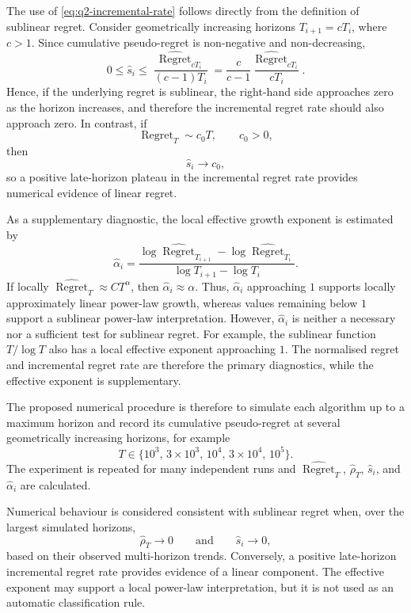 The use of \eqref{eq:q2-incremental-rate} follows directly from the
definition of sublinear regret. Consider geometrically increasing horizons
$T_{i+1}=cT_i$, where $c>1$. Since cumulative pseudo-regret is non-negative
and non-decreasing,
\[
    0
    \leq
    \widehat{s}_i
    \leq
    \frac{
        \widehat{\operatorname{Regret}}_{cT_i}
    }{
        (c-1)T_i
    }
    =
    \frac{c}{c-1}
    \frac{
        \widehat{\operatorname{Regret}}_{cT_i}
    }{
        cT_i
    }.
\]
Hence, if the underlying regret is sublinear, the right-hand side approaches
zero as the horizon increases, and therefore the incremental regret rate
should also approach zero. In contrast, if
\[
    \operatorname{Regret}_T
    \sim c_0 T,
    \qquad c_0>0,
\]
then
\[
    \widehat{s}_i
    \longrightarrow
    c_0,
\]
so a positive late-horizon plateau in the incremental regret rate provides
numerical evidence of linear regret.

As a supplementary diagnostic, the local effective growth exponent is
estimated by
\[
    \widehat{\alpha}_i
    =
    \frac{
        \log
        \widehat{\operatorname{Regret}}_{T_{i+1}}
        -
        \log
        \widehat{\operatorname{Regret}}_{T_i}
    }{
        \log T_{i+1}-\log T_i
    }.
\]
If locally
$\widehat{\operatorname{Regret}}_T\approx CT^\alpha$, then
$\widehat{\alpha}_i\approx\alpha$. Thus,
$\widehat{\alpha}_i$ approaching $1$ supports locally approximately linear
power-law growth, whereas values remaining below $1$ support a sublinear
power-law interpretation. However, $\widehat{\alpha}_i$ is neither a
necessary nor a sufficient test for sublinear regret. For example, the
sublinear function $T/\log T$ also has a local effective exponent approaching
$1$. The normalised regret and incremental regret rate are therefore the
primary diagnostics, while the effective exponent is supplementary.

The proposed numerical procedure is therefore to simulate each algorithm
up to a maximum horizon and record its cumulative pseudo-regret at several
geometrically increasing horizons, for example
\[
    T\in
    \{10^3,\,3\times10^3,\,10^4,\,3\times10^4,\,10^5\}.
\]
The experiment is repeated for many independent runs and
$\widehat{\operatorname{Regret}}_T$,
$\widehat{\rho}_T$,
$\widehat{s}_i$, and
$\widehat{\alpha}_i$
are calculated.

Numerical behaviour is considered consistent with sublinear regret when,
over the largest simulated horizons,
\[
    \widehat{\rho}_T
    \longrightarrow 0
    \qquad\text{and}\qquad
    \widehat{s}_i
    \longrightarrow 0,
\]
based on their observed multi-horizon trends. Conversely, a positive
late-horizon incremental regret rate provides evidence of a linear
component. The effective exponent may support a local power-law
interpretation, but it is not used as an automatic classification rule.

